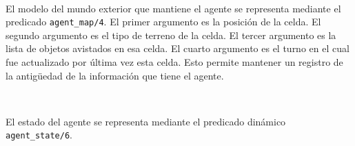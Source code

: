 \documentclass[a4paper,12pt]{report}
\begin{document}
\ 

El modelo del mundo exterior que mantiene el agente se representa mediante el predicado 
\texttt{agent\_map/4}.
El primer argumento es la posici\'{o}n de la celda.
El segundo argumento es el tipo de terreno de la celda.
El tercer argumento es la lista de objetos avistados en esa celda. 
El cuarto argumento es el turno en el cual fue actualizado por \'{u}ltima vez esta celda. 
Esto permite mantener un registro de la antig\"{u}edad de la informaci\'{o}n que tiene el agente. 

\ 

%


El estado del agente se representa mediante el predicado din\'{a}mico \texttt{agent\_state/6}.
\end{document}
